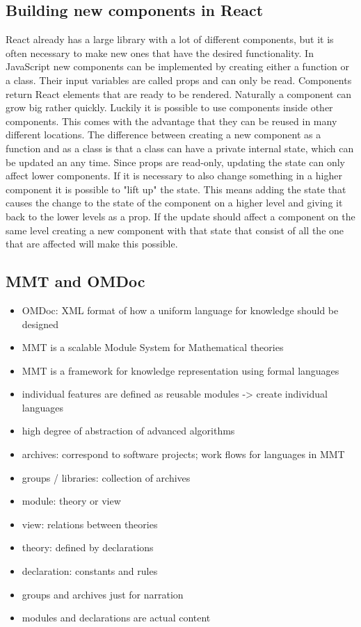\documentclass[11pt,a4paper]{article}
\begin{document}
	
	\subsection{Building new components in React}
	React already has a large library with a lot of different components, but it is often necessary to make new ones that have the desired functionality. In JavaScript new components can be implemented by creating either a function or a class. Their input variables are called props and can only be read. Components return React elements that are ready to be rendered. Naturally a component can grow big rather quickly. Luckily it is possible to use components inside other components. This comes with the advantage that they can be reused in many different locations. The difference between creating a new component as a function and as a class is that a class can have a private internal state, which can be updated an any time. Since props are read-only, updating the state can only affect lower components. If it is necessary to also change something in a higher component it is possible to "lift up" the state. This means adding the state that causes the change to the state of the component on a higher level and giving it back to the lower levels as a prop. If the update should affect a component on the same level creating a new component with that state that consist of all the one that are affected will  make this possible.
\cite{reactjsGS}

\subsection{MMT and OMDoc}
\begin{itemize}
\item OMDoc: XML format of how a uniform language for knowledge should be designed
\item MMT is a scalable Module System for Mathematical theories
\item MMT is a framework for knowledge representation using formal languages
\item individual features are defined as reusable modules -> create individual languages
\item high degree of abstraction of advanced algorithms
\item archives: correspond to software projects; work flows for languages in MMT
\item groups / libraries: collection of archives
\item module: theory or view
\item view: relations between theories
\item theory: defined by declarations
\item declaration: constants and rules
\item groups and archives just for narration
\item modules and declarations are actual content
\cite{mmt}
\end{itemize}
 
\end{document}
